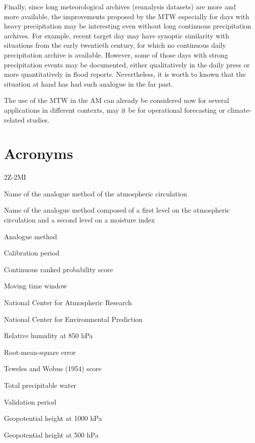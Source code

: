 \documentclass[hess, manuscript]{copernicus}
\begin{document}
	Finally, since long meteorological archives (reanalysis datasets) are more and more available, the improvements proposed by the MTW especially for days with heavy precipitation may be interesting even without long continuous precipitation archives. For example, recent target day may have synoptic similarity with situations from the early twentieth century, for which no continuous daily precipitation archive is available. However, some of those days with strong precipitation events may be documented, either qualitatively in the daily press or more quantitatively in flood reports. Nevertheless, it is worth to known that the situation at hand has had such analogue in the far past.
	
	The use of the MTW in the AM can already be considered now for several applications in different contexts, may it be for operational forecasting or climate-related studies.
	
	
	\appendix
	\section{Acronyms}    %
	
	\begin{labeling}{2Z-2MI}
		\item [2Z] Name of the analogue method of the atmospheric circulation
		\item [2Z-2MI] Name of the analogue method composed of a first level on the atmospheric circulation and a second level on a moisture index
		\item [AM] Analogue method
		\item [CP] Calibration period
		\item [CRPS] Continuous ranked probability score
		\item [MTW] Moving time window
		\item [NCAR] National Center for Atmospheric Research
		\item [NCEP] National Center for Environmental Prediction
		\item [RH850] Relative humidity at 850 hPa
		\item [RMSE] Root-mean-square error
		\item [S1] Teweles and Wobus (1954) score
		\item [TPW] Total precipitable water
		\item [VP] Validation period
		\item [Z1000] Geopotential height at 1000 hPa
		\item [Z500] Geopotential height at 500 hPa
	\end{labeling}
	
\end{document}
